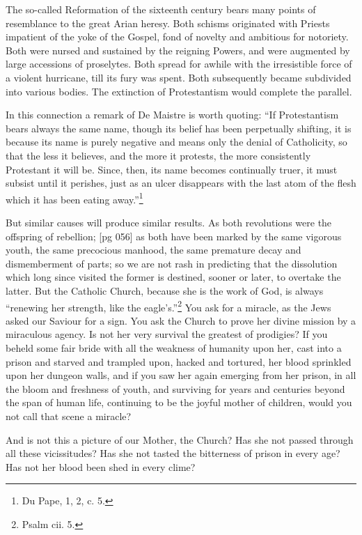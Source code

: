 The so-called Reformation of the sixteenth century
bears many points of resemblance to the great
Arian heresy. Both schisms originated with
Priests impatient of the yoke of the Gospel, fond
of novelty and ambitious for notoriety. Both were
nursed and sustained by the reigning Powers, and
were augmented by large accessions of proselytes.
Both spread for awhile with the irresistible force
of a violent hurricane, till its fury was spent.
Both subsequently became subdivided into various
bodies. The extinction of Protestantism
would complete the parallel.

In this connection a remark of De Maistre is
worth quoting: “If Protestantism bears always
the same name, though its belief has been perpetually
shifting, it is because its name is purely
negative and means only the denial of Catholicity,
so that the less it believes, and the more it protests,
the more consistently Protestant it will be.
Since, then, its name becomes continually truer,
it must subsist until it perishes, just as an ulcer
disappears with the last atom of the flesh which
it has been eating away.”\footnote{Du Pape, 1, 2, c. 5.}

But similar causes will produce similar results.
As both revolutions were the offspring of rebellion;
[pg 056]
as both have been marked by the same vigorous
youth, the same precocious manhood, the same
premature decay and dismemberment of parts; so
we are not rash in predicting that the dissolution
which long since visited the former is destined,
sooner or later, to overtake the latter. But the
Catholic Church, because she is the work of God,
is always “renewing her strength, like the eagle's.”\footnote{Psalm
cii. 5.}
You ask for a miracle, as the Jews asked our Saviour
for a sign. You ask the Church to prove her
divine mission by a miraculous agency. Is not her
very survival the greatest of prodigies? If you
beheld some fair bride with all the weakness of
humanity upon her, cast into a prison and starved
and trampled upon, hacked and tortured, her blood
sprinkled upon her dungeon walls, and if you saw
her again emerging from her prison, in all the
bloom and freshness of youth, and surviving for
years and centuries beyond the span of human life,
continuing to be the joyful mother of children,
would you not call that scene a miracle?

And is not this a picture of our Mother, the
Church? Has she not passed through all these
vicissitudes? Has she not tasted the bitterness of
prison in every age? Has not her blood been shed
in every clime?

